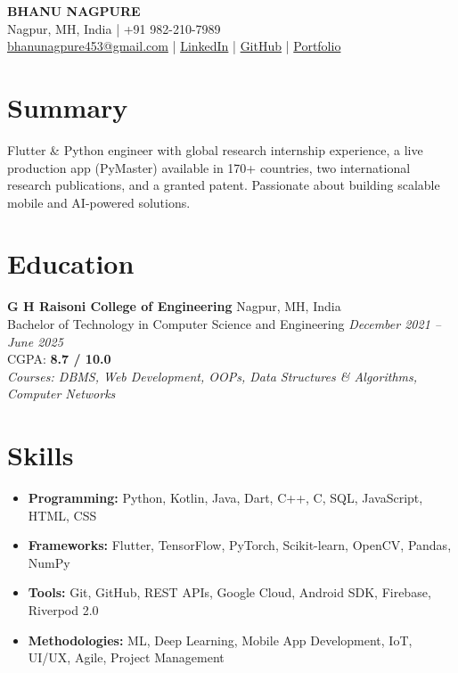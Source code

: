 \documentclass[10pt, letterpaper]{article}
\begin{document}
\begin{center}
    {\LARGE \textbf{BHANU NAGPURE}} \\[4pt]
    Nagpur, MH, India \quad | \quad +91 982-210-7989 \\[2pt]
    \href{mailto:bhanunagpure453@gmail.com}{bhanunagpure453@gmail.com} \quad | \quad
    \href{https://linkedin.com/in/bhanunagpure}{LinkedIn} \quad | \quad
    \href{https://github.com/bhanu-dev82}{GitHub} \quad | \quad
    \href{https://bhanu-dev82.github.io}{Portfolio}
\end{center}

\section{Summary}
Flutter \& Python engineer with global research internship experience, a live production app (PyMaster) available in 170+ countries, two international research publications, and a granted patent. Passionate about building scalable mobile and AI-powered solutions.

\section{Education}
\textbf{G H Raisoni College of Engineering} \hfill Nagpur, MH, India \\
Bachelor of Technology in Computer Science and Engineering \hfill \textit{December 2021 -- June 2025} \\
CGPA: \textbf{8.7 / 10.0} \\[2pt]
\textit{Courses: DBMS, Web Development, OOPs, Data Structures \& Algorithms, Computer Networks}

\section{Skills}
\begin{itemize}[leftmargin=*, noitemsep, topsep=2pt]
    \item \textbf{Programming:} Python, Kotlin, Java, Dart, C++, C, SQL, JavaScript, HTML, CSS
    \item \textbf{Frameworks:} Flutter, TensorFlow, PyTorch, Scikit-learn, OpenCV, Pandas, NumPy
    \item \textbf{Tools:} Git, GitHub, REST APIs, Google Cloud, Android SDK, Firebase, Riverpod 2.0
    \item \textbf{Methodologies:} ML, Deep Learning, Mobile App Development, IoT, UI/UX, Agile, Project Management
\end{itemize}
\end{document}
